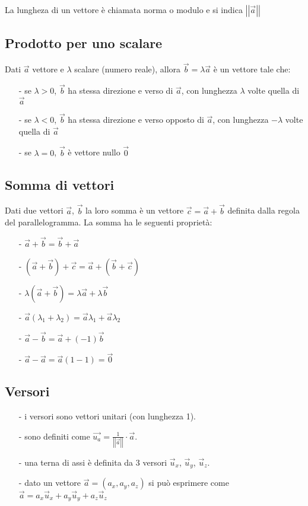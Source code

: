 \documentclass[a4paper]{article}
\newcommand\ux{\vec{u}_x}
\newcommand\uy{\vec{u}_y}
\newcommand\uz{\vec{u}_z}
\newcommand\vmod[1]{\left|\left|{#1}\right|\right|}
\begin{document}
La lungheza di un vettore è chiamata norma o modulo e si indica \(\vmod{\vec{a}}\)

\subsection{Prodotto per uno scalare}
Dati \(\vec{a}\) vettore e \(\lambda\) scalare (numero reale), allora \(\vec{b} = \lambda \vec{a}\) è un vettore tale che:
\begin{itemize}[topsep=3pt, itemsep=0pt]
	\item[-] se \(\lambda > 0\), \(\vec{b}\) ha stessa direzione e verso di \(\vec{a}\), con lunghezza \(\lambda\) volte quella di \(\vec{a}\)
	\item[-] se \(\lambda < 0\), \(\vec{b}\) ha stessa direzione e verso opposto di \(\vec{a}\), con lunghezza \(-\lambda\) volte quella di \(\vec{a}\)
	\item[-] se \(\lambda = 0\), \(\vec{b}\) è vettore nullo \(\vec{0}\)
\end{itemize}

\subsection{Somma di vettori}
Dati due vettori \(\vec{a}\), \(\vec{b}\) la loro somma è un vettore \(\vec{c} = \vec{a} + \vec{b}\) definita dalla regola del
parallelogramma. La somma ha le seguenti proprietà:
\begin{itemize}[topsep=3pt, itemsep=0pt]
	\item[-] \(\vec{a} + \vec{b} = \vec{b} + \vec{a}\)
	\item[-] \((\vec{a} + \vec{b}) + \vec{c} = \vec{a} + (\vec{b} + \vec{c})\)
	\item[-] \(\lambda (\vec{a} + \vec{b}) = \lambda \vec{a} + \lambda \vec{b}\)
	\item[-] \(\vec{a} (\lambda_1 + \lambda_2) = \vec{a} \lambda_1 + \vec{a} \lambda_2\)
	\item[-] \(\vec{a} - \vec{b} = \vec{a} + (-1)\vec{b}\)
	\item[-] \(\vec{a} - \vec{a} = \vec{a}(1-1) = \vec{0}\)
\end{itemize}	


\subsection{Versori}
\begin{itemize}[topsep=3pt, itemsep=0pt]
	\item[-] i versori sono vettori unitari (con lunghezza 1).
	\item[-] sono definiti come \(\vec{u_a} = \frac{1}{\vmod{\vec{a}}} \cdot \vec{a}\).
	\item[-] una terna di assi è definita da 3 versori \(\ux\), \(\uy\), \(\uz\).
	\item[-] dato un vettore \(\vec{a} = \left(a_x, a_y, a_z\right)\) si può esprimere come \(\vec{a} = a_x \ux + a_y \uy + a_z \uz\)
\end{itemize}
\end{document}
